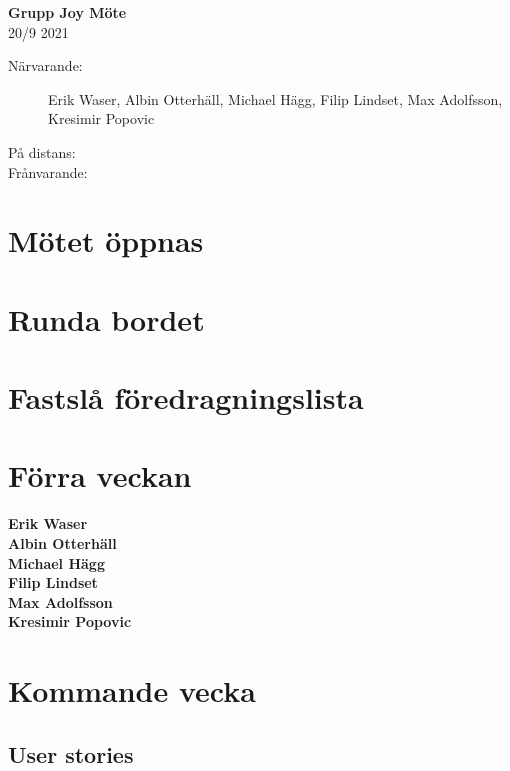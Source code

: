 \documentclass[9pt]{article}
\newcommand{\Waser}{Erik Waser\xspace}
\newcommand{\Slaget}{Albin Otterhäll\xspace}
\newcommand{\Max}{Max Adolfsson\xspace}
\newcommand{\Kim}{Michael Hägg\xspace}
\newcommand{\Algen}{Filip Lindset\xspace}
\newcommand{\Kres}{Kresimir Popovic\xspace}
\newcommand{\datum}{20/9 2021} %
\begin{document}
\begin{center}
    \Large{\textbf{Grupp Joy Möte}}\\
    \normalsize
    \datum \\ %
\end{center}

\begin{description} %
  \item [Närvarande:] \Waser, \Slaget, \Kim, \Algen, \Max, \\ \Kres
  \item [På distans:]
  \item [Frånvarande:] 

\end{description}

\section{Mötet öppnas}

\section{Runda bordet}

\section{Fastslå föredragningslista}

\section{Förra veckan}
\textbf{\Waser}\\
\textbf{\Slaget}\\
\textbf{\Kim}\\
\textbf{\Algen}\\
\textbf{\Max}\\
\textbf{\Kres}\\

\section{Kommande vecka}
\subsection{User stories}
\end{document}
